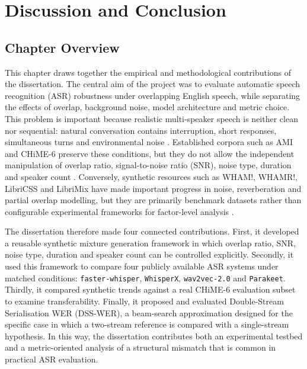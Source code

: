 \chapter{Discussion and Conclusion}

\section{Chapter Overview}
This chapter draws together the empirical and methodological contributions of the dissertation. The central aim of the project was to evaluate automatic speech recognition (ASR) robustness under overlapping English speech, while separating the effects of overlap, background noise, model architecture and metric choice. This problem is important because realistic multi-speaker speech is neither clean nor sequential: natural conversation contains interruption, short responses, simultaneous turns and environmental noise \citep{Conversation_in_small_groups, Shriberg2001ObservationsOO, cetin06_interspeech}. Established corpora such as AMI and CHiME-6 preserve these conditions, but they do not allow the independent manipulation of overlap ratio, signal-to-noise ratio (SNR), noise type, duration and speaker count \citep{ami-corpus, carletta2005ami, chime6, watanabe2020chime6challengetacklingmultispeakerspeech}. Conversely, synthetic resources such as WHAM!, WHAMR!, LibriCSS and LibriMix have made important progress in noise, reverberation and partial overlap modelling, but they are primarily benchmark datasets rather than configurable experimental frameworks for factor-level analysis \citep{wichern2019whamextendingspeechseparation, maciejewski2020whamrnoisyreverberantsinglechannel, chen2020continuousspeechseparationdataset, cosentino2020librimixopensourcedatasetgeneralizable}.

The dissertation therefore made four connected contributions. First, it developed a reusable synthetic mixture generation framework in which overlap ratio, SNR, noise type, duration and speaker count can be controlled explicitly. Secondly, it used this framework to compare four publicly available ASR systems under matched conditions: \texttt{faster-whisper}, \texttt{WhisperX}, \texttt{wav2vec-2.0} and \texttt{Parakeet}. Thirdly, it compared synthetic trends against a real CHiME-6 evaluation subset to examine transferability. Finally, it proposed and evaluated Double-Stream Serialisation WER (DSS-WER), a beam-search approximation designed for the specific case in which a two-stream reference is compared with a single-stream hypothesis. In this way, the dissertation contributes both an experimental testbed and a metric-oriented analysis of a structural mismatch that is common in practical ASR evaluation.


